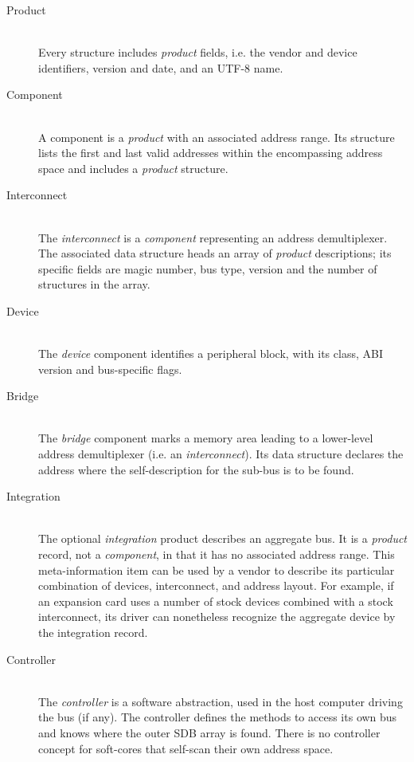 \documentclass[a4paper, 12pt]{article}
\begin{document}
\begin{description}
\item[Product] \hfill \\
Every structure includes \textit{product} fields, i.e.
the vendor and device identifiers, version and date, and an UTF-8
name.

\item[Component] \hfill \\
A component is a \textit{product} with an associated address range. Its
structure lists the first and last valid addresses within
the encompassing address space and includes a \textit{product}
structure.

\item[Interconnect] \hfill \\
The \textit{interconnect} is a \textit{component} representing an address demultiplexer.
The associated data structure heads an array of \textit{product} descriptions;
its specific fields are magic number, bus type, version and the number of
structures in the array.

\item[Device] \hfill \\
The \textit{device} component identifies a peripheral block, with
its class, ABI version and bus-specific flags.

\item[Bridge] \hfill \\
The \textit{bridge} component marks a memory area leading to a lower-level
address demultiplexer (i.e. an \textit{interconnect}). Its data
structure declares the address where the self-description for the
sub-bus is to be found.

\item[Integration] \hfill \\
The optional \textit{integration} product describes an aggregate bus.
It is a \textit{product} record, not a
\textit{component}, in that it has no associated address range. This
meta-information item can be used by a vendor to describe
its particular combination of devices, interconnect, and address layout.
For example, if an expansion card uses a number of stock devices
combined with a stock interconnect, its driver can nonetheless recognize
the aggregate device by the integration record.

\item[Controller] \hfill \\
The \textit{controller} is a software abstraction, used in the host
computer driving the bus (if any). The controller defines the
methods to access its own bus and knows where the outer SDB
array is found.  There is no controller concept for soft-cores
that  self-scan their own address space.

\end{description}
\end{document}
